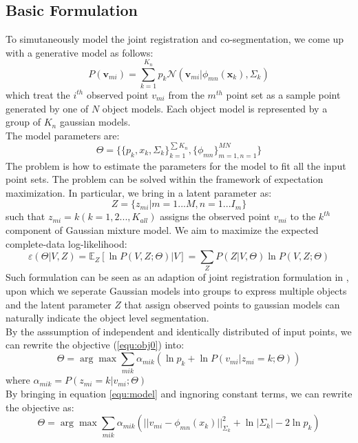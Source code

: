 \subsection{Basic Formulation}

To simutaneously model the joint registration and co-segmentation,  we come up with a generative model as follows:
\begin{equation}
\label{equ:model}
P(\pmb{v}_{mi})=\sum^{K_n}_{k=1}p_k\mathcal{N}(\pmb{v}_{mi}|\phi_{mn}(\pmb{x}_k),\Sigma_k)
\end{equation}
which treat the $i^{th}$ observed point $v_{mi}$ from the $m^{th}$ point set as a sample point generated by one of $N$ object models.
Each object model is represented by a group of $K_n$ gaussian models.\\
The model parameters are:
$$\Theta=\{\{p_k,x_k,\Sigma_k\}_{k=1}^{\sum{K_n}},\{\phi_{mn}\}_{m=1,n=1}^{MN}\}$$
The problem is how to estimate the parameters for the model to fit all the input point sets. The problem can be solved within the framework of expectation maximization. In particular, we bring in a latent parameter as:\\
$$Z=\{z_{mi}|m=1...M,n=1...I_m\}$$
such that $z_{mi}=k(k=1,2...,K_{all})$ assigns the observed point $v_{mi}$ to the $k^{th}$ component of Gaussian mixture model. We aim to maximize the expected complete-data log-likelihood:
\begin{equation}
\label{equ:obj0}
\varepsilon(\Theta|V,Z)=\mathbb{E}_Z[\ln P(V,Z;\Theta)|V]={\sum_ZP(Z|V,\Theta)\ln{P(V,Z;\Theta)}}
\end{equation}
Such formulation can be seen as an adaption of joint registration formulation in \cite{Evangelidis2014}, upon which we seperate Gaussian models into groups to express multiple objects and the latent parameter  $Z$ that assign observed points to gaussian models can naturally indicate the object level segmentation.\\
By the asssumption of independent and identically distributed of input points, we can rewrite the objective (\ref{equ:obj0}) into:
\begin{equation}
\label{equ:obj2}
\Theta=\arg\max\sum_{mik}\alpha_{mik}(\ln p_k + \ln P(v_{mi}|z_{mi}=k;\Theta))
\end{equation}
where $\alpha_{mik} = P( z_{mi} = k | v_{mi} ; \Theta )$\\
By bringing in equation \ref{equ:model} and ingnoring constant terms, we can rewrite the objective as:
\begin{equation}
\label{equ:obj3}
\Theta=\arg\max\sum_{mik}\alpha_{mik}(||v_{mi}-\phi_{mn}(x_k)||_{\Sigma_k}^2 + \ln |\Sigma_k| - 2\ln p_k)
\end{equation}
